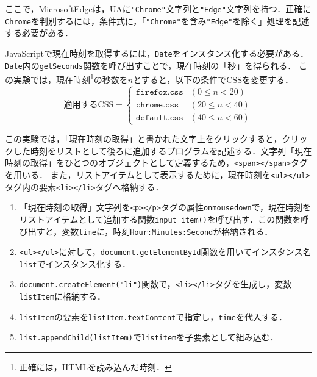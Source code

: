 ここで，MicrosoftEdgeは，UAに\texttt{"Chrome"}文字列と\texttt{"Edge"}文字列を持つ．正確に\texttt{Chrome}を判別するには，条件式に，「\texttt{"Chrome"}を含み\texttt{"Edge"}を除く」処理を記述する必要がある．\\
\par
JavaScriptで現在時刻を取得するには，\texttt{Date}をインスタンス化する必要がある．\texttt{Date}内の\texttt{getSeconds}関数を呼び出すことで，現在時刻の「秒」を得られる．
この実験では，現在時刻\footnote{正確には，HTMLを読み込んだ時刻．}の秒数を\(n\)とすると，以下の条件でCSSを変更する．
\begin{equation*}
    \textrm{適用するCSS}=
    \begin{cases}
        \texttt{firefox.css} & (0\leq n<20)  \\
        \texttt{chrome.css}  & (20\leq n<40) \\
        \texttt{default.css} & (40\leq n<60)
    \end{cases}
\end{equation*}
\par
この実験では，「現在時刻の取得」と書かれた文字上をクリックすると，クリックした時刻をリストとして後ろに追加するプログラムを記述する．文字列「現在時刻の取得」をひとつのオブジェクトとして定義するため，\texttt{<span></span>}タグを用いる．
また，リストアイテムとして表示するために，現在時刻を\texttt{<ul></ul>}タグ内の要素\texttt{<li></li>}タグへ格納する．\par
\begin{enumerate}
    \item 「現在時刻の取得」文字列を\texttt{<p></p>}タグの属性\texttt{onmousedown}で，現在時刻をリストアイテムとして追加する関数\texttt{input\_item()}を呼び出す．この関数を呼び出すと，変数\texttt{time}に，時刻\texttt{Hour:Minutes:Second}が格納される．
    \item \texttt{<ul></ul>}に対して，\texttt{document.getElementById}関数を用いてインスタンス名\texttt{list}でインスタンス化する．
    \item \texttt{document.createElement("li")}関数で，\texttt{<li></li>}タグを生成し，変数\texttt{listItem}に格納する．
    \item \texttt{listItem}の要素を\texttt{listItem.textContent}で指定し，\texttt{time}を代入する．
    \item \texttt{list.appendChild(listItem)}で\texttt{listitem}を子要素として組み込む．
\end{enumerate}
